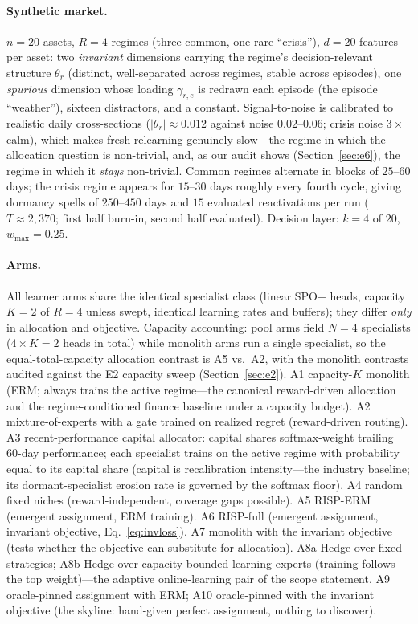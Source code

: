 \documentclass{article}
\newcommand{\nm}{\textsc{RISP}}
\begin{document}
\paragraph{Synthetic market.} $n = 20$ assets, $R = 4$ regimes (three
common, one rare ``crisis''), $d = 20$ features per asset: two
\emph{invariant} dimensions carrying the regime's decision-relevant
structure $\theta_r$ (distinct, well-separated across regimes, stable
across episodes), one \emph{spurious} dimension whose loading
$\gamma_{r,e}$ is redrawn each episode (the episode ``weather''), sixteen
distractors, and a constant. Signal-to-noise is calibrated to realistic
daily cross-sections ($|\theta_r| \approx 0.012$ against noise
$0.02$--$0.06$; crisis noise $3\times$ calm), which makes fresh relearning
genuinely slow---the regime in which the allocation question is
non-trivial, and, as our audit shows (Section~\ref{sec:e6}), the regime in
which it \emph{stays} non-trivial. Common regimes alternate in blocks of
$25$--$60$ days; the crisis regime appears for $15$--$30$ days roughly
every fourth cycle, giving dormancy spells of $250$--$450$ days and $15$
evaluated reactivations per run ($T \approx 2{,}370$; first half burn-in,
second half evaluated). Decision layer: $k = 4$ of $20$, $w_{\max} = 0.25$.

\paragraph{Arms.} All learner arms share the identical specialist class
(linear SPO+ heads, capacity $K = 2$ of $R = 4$ unless swept, identical
learning rates and buffers); they differ \emph{only} in allocation and
objective. Capacity accounting: pool arms field $N = 4$ specialists
($4 \times K{=}2$ heads in total) while monolith arms run a single
specialist, so the equal-total-capacity allocation contrast is A5 vs.\
A2, with the monolith contrasts audited against the E2 capacity sweep
(Section~\ref{sec:e2}). A1 capacity-$K$ monolith (ERM; always trains the active
regime---the canonical reward-driven allocation and the regime-conditioned
finance baseline under a capacity budget). A2 mixture-of-experts with a
gate trained on realized regret (reward-driven routing). A3
recent-performance capital allocator: capital shares softmax-weight
trailing 60-day performance; each specialist trains on the active regime
with probability equal to its capital share (capital is recalibration
intensity---the industry baseline; its dormant-specialist erosion rate is
governed by the softmax floor). A4 random fixed niches
(reward-independent, coverage gaps possible). A5 \nm{}-ERM (emergent
assignment, ERM training). A6 \nm{}-full (emergent assignment, invariant
objective, Eq.~\ref{eq:invloss}). A7 monolith with the invariant objective
(tests whether the objective can substitute for allocation). A8a Hedge
over fixed strategies; A8b Hedge over capacity-bounded learning experts
(training follows the top weight)---the adaptive online-learning pair of
the scope statement. A9 oracle-pinned assignment with ERM; A10
oracle-pinned with the invariant objective (the skyline: hand-given
perfect assignment, nothing to discover).
\end{document}
